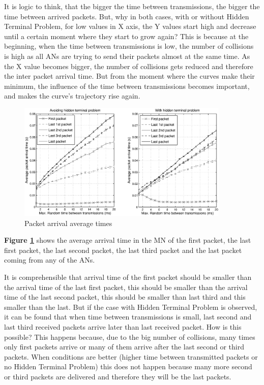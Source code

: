It is logic to think, that the bigger the time between transmissions, the bigger the time between arrived packets. But, why in both cases, with 
or without Hidden Terminal Problem, for low values in X axis, the Y values start high and decrease until a certain moment where they start to 
grow again? This is because at the beginning, when the time between transmissions is low, the number of collisions is high as all \acp{AN} are 
trying to send their packets almost at the same time. As the X value becomes bigger, the number of collisions gets reduced and therefore the inter 
packet arrival time. But from the moment where the curves make their minimum, the influence of the time between transmissions becomes 
important, and makes the curve's trajectory rise again.

\begin{figure}[H]
 \begin{center}
  \includegraphics[width=0.9\textwidth]{averageDifferentTimes.eps}
 \end{center}
 \caption{Packet arrival average times}
 \label{fig:averageDifferentTimes}
\end{figure}

\textbf{Figure \ref{fig:averageDifferentTimes}} shows the average arrival time in the \ac{MN} of the first packet, the last first packet, the last
second packet, the last third packet and the last packet coming from any of the \acp{AN}.

It is comprehensible that arrival time of the first packet should be smaller than the arrival time of the last first packet, this should be smaller than
 the arrival time of the last second packet, this should be smaller than last third and this smaller than the last. But if the case with Hidden 
Terminal Problem is observed, it can be found that when time between transmissions is small, last second and last third received packets arrive later 
than last received packet. How is this possible? This happens because, due to the big number of collisions, many times only first packets arrive or many of 
them arrive after the last second or third packets. When conditions are better (higher time between transmitted packets or no Hidden Terminal Problem) 
this does not happen because many more second or third packets are delivered and therefore they will be the last packets.

